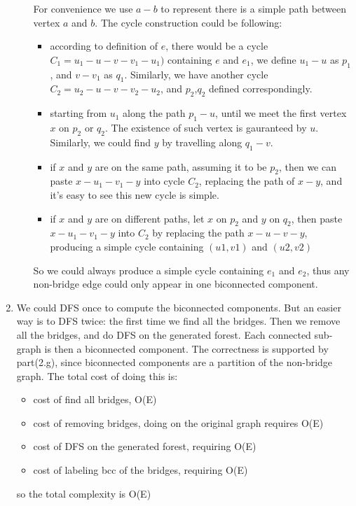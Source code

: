\documentclass[paper=a4, fontsize=11pt]{scrartcl} %
\numberwithin{equation}{section} %
\numberwithin{figure}{section} %
\numberwithin{table}{section} %
\begin{document}
\begin{enumerate}[label={2.(\alph*)}]
\begin{enumerate}
      For convenience we use $a-b$ to represent there is a simple path between vertex $a$ and $b$. The cycle construction could be following:
      \begin{itemize}
	\item according to definition of $e$, there would be a cycle $C_1=u_1-u-v-v_1-u_1)$ containing $e$ and $e_1$, we define $u_1-u$ as $p_1$, and
	  $v-v_1$ as $q_1$. Similarly, we have another cycle $C_2=u_2-u-v-v_2-u_2$, and $p_2$,$q_2$ defined correspondingly.
	\item starting from $u_1$ along the path $p_1-u$, until we meet the first vertex $x$ on $p_2$ or $q_2$. The existence of such vertex is
	  gauranteed by $u$. Similarly, we could find $y$ by travelling along $q_1-v$. 
	\item if $x$ and $y$ are on the same path, assuming it to be $p_2$, then we can paste $x-u_1-v_1-y$ into cycle $C_2$, replacing
	  the path of $x-y$, and it's easy to see this new cycle is simple.
	\item if $x$ and $y$ are on different paths, let $x$ on $p_2$ and $y$ on $q_2$, then paste $x-u_1-v_1-y$ into $C_2$ by
	  replacing the path $x-u-v-y$, producing a simple cycle containing $(u1,v1)$ and $(u2,v2)$
      \end{itemize}
      So we could always produce a simple cycle containing $e_1$ and $e_2$, thus any non-bridge edge could only appear in one
      biconnected component.

  \end{enumerate}


  \item 
    We could DFS once to compute the biconnected components. But an easier way is to DFS twice: the first time we find all the bridges. Then
    we remove all the bridges, and do DFS on the generated forest. Each connected sub-graph is then a biconnected component. The correctness
    is supported by part(2.g), since biconnected components are a partition of the non-bridge graph. The total cost of doing this is:
    \begin{itemize}
      \item cost of find all bridges, O(E)
      \item cost of removing bridges, doing on the original graph requires O(E)
      \item cost of DFS on the generated forest, requiring O(E)
      \item cost of labeling bcc of the bridges, requiring O(E)
    \end{itemize}
    so the total complexity is O(E)
\end{enumerate}
\end{document}

